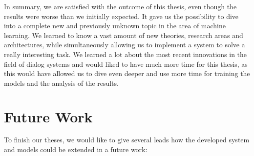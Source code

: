 In summary, we are satisfied with the outcome of this thesis, even though the results were worse than we initially expected. It gave us the possibility to dive into a complete new and previously unknown topic in the area of machine learning. We learned to know a vast amount of new theories, research areas and architectures, while simultaneously allowing us to implement a system to solve a really interesting task. We learned a lot about the most recent innovations in the field of dialog systems and would liked to have much more time for this thesis, as this would have allowed us to dive even deeper and use more time for training the models and the analysis of the results.

\chapter{Future Work}

To finish our theses, we would like to give several leads how the developed system and models could be extended in a future work:

